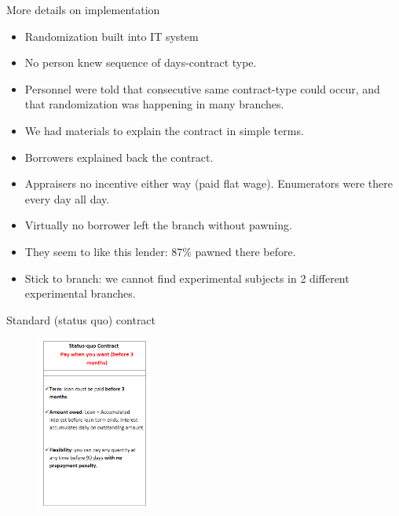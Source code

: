 \documentclass[9pt, aspectratio=169]{beamer}
\begin{document}
\begin{frame}{More details on implementation}
    \begin{itemize}
        \item Randomization built into IT system
        \item No person knew sequence of days-contract type.
        \item  Personnel were told that consecutive same contract-type could occur, and that randomization was happening in many branches.
        \item We had materials to explain the contract in simple terms.
        \item Borrowers explained back the contract.
        \item Appraisers no incentive either way (paid flat wage). Enumerators were there every day all day.
        \item Virtually no borrower left the branch without pawning.
        \item They seem to like this lender: 87\% pawned there before.
        \item Stick to branch: we cannot find experimental subjects in 2 different experimental branches. 
    \end{itemize}
\end{frame}




\begin{frame}{Standard (status quo) contract}
\vspace{-.2in}
    \begin{figure}[H]
    \label{ExplanatoryMaterial1}
    \begin{center}
        \includegraphics[width=0.34\textwidth]{Figuras/sq_contract.png}
    \end{center}
\end{figure}
\end{frame}
\end{document}
